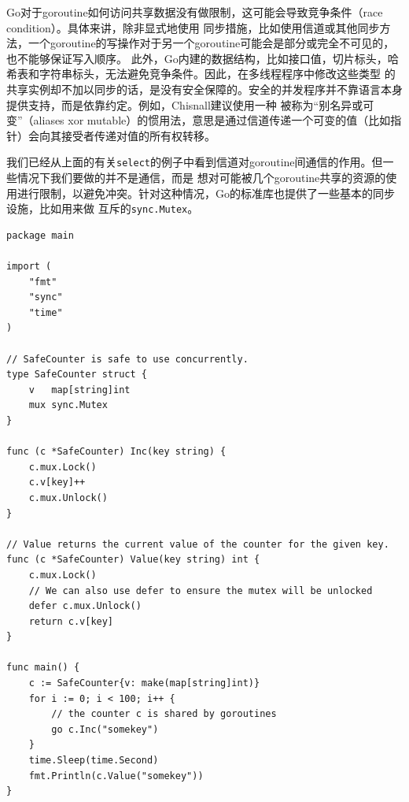 \documentclass[12pt]{article}
\begin{document}
\indent{}Go对于goroutine如何访问共享数据没有做限制，这可能会导致竞争条件（race condition）。具体来讲，除非显式地使用
同步措施，比如使用信道或其他同步方法，一个goroutine的写操作对于另一个goroutine可能会是部分或完全不可见的，也不能够保证写入顺序。
此外，Go内建的数据结构，比如接口值，切片标头，哈希表和字符串标头，无法避免竞争条件。因此，在多线程程序中修改这些类型
的共享实例却不加以同步的话，是没有安全保障的。安全的并发程序并不靠语言本身提供支持，而是依靠约定。例如，Chisnall建议使用一种
被称为“别名异或可变”（aliases xor mutable）的惯用法，意思是通过信道传递一个可变的值（比如指针）会向其接受者传递对值的所有权转移。

\indent{}我们已经从上面的有关\texttt{select}的例子中看到信道对goroutine间通信的作用。但一些情况下我们要做的并不是通信，而是
想对可能被几个goroutine共享的资源的使用进行限制，以避免冲突。针对这种情况，Go的标准库也提供了一些基本的同步设施，比如用来做
互斥的\texttt{sync.Mutex}。
\begin{verbatim}
package main

import (
    "fmt"
    "sync"
    "time"
)

// SafeCounter is safe to use concurrently.
type SafeCounter struct {
    v   map[string]int
    mux sync.Mutex
}

func (c *SafeCounter) Inc(key string) {
    c.mux.Lock()
    c.v[key]++
    c.mux.Unlock()
}

// Value returns the current value of the counter for the given key.
func (c *SafeCounter) Value(key string) int {
    c.mux.Lock()
    // We can also use defer to ensure the mutex will be unlocked
    defer c.mux.Unlock()
    return c.v[key]
}

func main() {
    c := SafeCounter{v: make(map[string]int)}
    for i := 0; i < 100; i++ {
        // the counter c is shared by goroutines
        go c.Inc("somekey")
    }
    time.Sleep(time.Second)
    fmt.Println(c.Value("somekey"))
}
\end{verbatim}
\end{document}
